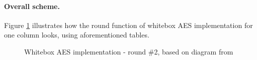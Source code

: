 \documentclass[11pt,oneside,final]{fithesis2}
\begin{document}
    \paragraph*{Overall scheme.}
    
    Figure \ref{fig:wbaes} illustrates how the round function of whitebox AES implementation for one column looks, using aforementioned tables.
    \begin{figure}
    \begin{center}
    \leavevmode
    \centerline{}
    \end{center}
    \caption{Whitebox AES implementation - round \#2, based on diagram from~\citep{Muir_atutorial}}
    \label{fig:wbaes}
    \end{figure}
\end{document}
